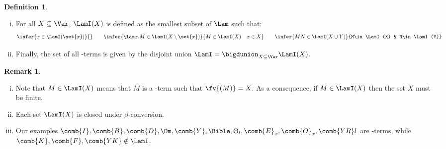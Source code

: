 \documentclass[10pt,a4paper]{amsart}
\theoremstyle{definition}
\newtheorem{definition}[theorem]{Definition}
\newtheorem{remark}[theorem]{Remark}
\newcommand{\bsub}{\begin{enumerate}[(i)]}
\newcommand{\esub}{\end{enumerate}}
\begin{document}
\begin{definition}\label{def:LamI}\mbox{}
\bsub
\item For all $X \subseteq \Var$, $\LamI(X)$ is defined as 
	the smallest subset of $\Lam$ such that:
\[
	\infer{x\in\LamI(\set{x})}{}\qquad
	\infer{\lam x.M\in\LamI(X\setminus\set{x})}{M\in\LamI(X)\quad x\in X}\qquad
	\infer{MN\in\LamI(X\cup Y)}{M\in\LamI(X) & N\in\LamI(Y)}
\]
\item Finally, the set of all \lamI-terms is given by 
	the disjoint union
	$\LamI = \bigdunion_{X\subseteq\Var}\LamI(X)$.
\esub
\end{definition}

\begin{remark}\label{rem:aboutLambdaI}\mbox{}
\bsub
\item Note that $M \in \LamI(X)$ means that $M$ is a \lamI-term such that $\fv{(M)}=X$.
As a consequence, if $M\in\LamI(X)$ then the set $X$ must be finite.
\item\label{rem:aboutLambdaI2} 
	Each set $\LamI(X)$ is closed under $\beta$-conversion.
\item Our examples $\comb{I},\comb{B},\comb{D},\Om,\comb{Y},\Bible,\Theta_l,\comb{E}_x,\comb{O}_x,\comb{YR}l$ are \lamI-terms, while $\comb{K},\comb{F},\comb{YK}\notin\LamI$.
\esub
\end{remark}
\end{document}
